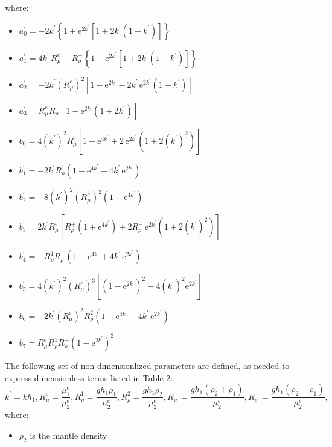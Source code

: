 where:
\begin{itemize}
	\item $a_0^{\prime} = -2k^{\prime} \left\{ 1 + \text{e}^{2k^{\prime}} \left[ 1 + 2k^{\prime} \left( 1 + k^{\prime} \right)  \right] \right\}$
	\item $a_1^{\prime} = 4k^{\prime} \, R_{\mu}^e - R_{\rho}^- \left\{ 1 + \text{e}^{2k^{\prime}} \left[ 1 + 2k^{\prime} \left( 1 + k^{\prime} \right)  \right] \right\}$
	\item $a_2^{\prime} = -2k^{\prime} \left( R_{\mu}^e \right)^2 \left[ 1 - \text{e}^{2k^{\prime}} - 2k^{\prime} \, \text{e}^{2k^{\prime}} \left( 1 + k^{\prime} \right) \right]$
	\item $a_3^{\prime} = R_{\mu}^e R_{\rho}^- \left[ 1 - \text{e}^{2k^{\prime}} \left( 1 + 2k^{\prime} \right) \right]$
	\item $b_0^{\prime} = 4 (k^{\prime})^2 R_{\mu}^e \left[ 1 + \text{e}^{4k^{\prime}} + 2 \, \text{e}^{2k^{\prime}} \left( 1 + 2 (k^{\prime})^2 \right) \right]$
	\item $b_1^{\prime} = - 2k^{\prime} R_{\rho}^1 \left( 1 -  \text{e}^{4k^{\prime}} + 4k^{\prime} \, \text{e}^{2k^{\prime}} \right)$
	\item $b_2^{\prime} = -8 (k^{\prime})^2 \left( R_{\mu}^e \right)^2 \left( 1- \text{e}^{4k^{\prime}}\right)$
	\item $b_3^{\prime} = 2k^{\prime} R_{\mu}^e \left[ R_{\rho}^+ \left( 1 + \text{e}^{4k^{\prime}} \right) + 2 R_{\rho}^- \, \text{e}^{2k^{\prime}} \left( 1 + 2 (k^{\prime})^2 \right) \right]$
	\item $b_4^{\prime} = - R_{\rho}^1 R_{\rho}^- \left( 1 - \text{e}^{4k^{\prime}} + 4k^{\prime} \, \text{e}^{2k^{\prime}} \right)$
	\item $b_5^{\prime} = 4 (k^{\prime})^2 \left( R_{\mu}^e \right)^3 \left[ \left( 1 - \text{e}^{2k^{\prime}} \right)^2 - 4 (k^{\prime})^2 \text{e}^{2k^{\prime}} \right]$
	\item $b_6^{\prime} = -2k^{\prime} \left( R_{\mu}^e \right)^2 R_{\rho}^2 \left( 1 - \text{e}^{4k^{\prime}} - 4k^{\prime} \, \text{e}^{2k^{\prime}} \right)$
	\item $b_7^{\prime} = R_{\mu}^e R_{\rho}^1 R_{\rho}^- \left( 1 - \text{e}^{2k^{\prime}} \right)^2$
\end{itemize}

The following set of non-dimensionlized parameters are defined, as needed to express dimensionless terms listed in Table 2:
\begin{equation}
	k^{\prime} = kh_1, R_{\mu}^{e} = \frac{\mu_1^e}{\mu_2^e}, R_{\rho}^1 = \frac{g h_1 \rho_1}{\mu_2^e}, R_{\rho}^2 = \frac{g h_1 \rho_2}{\mu_2^e}, R_{\rho}^+ = \frac{g h_1 \left( \rho_2 + \rho_1 \right)}{\mu_2^e}, R_{\rho}^- = \frac{g h_1 \left( \rho_2 - \rho_1 \right)}{\mu_2^e},
\end{equation}
where:
\begin{itemize}
	\item $\rho_2$ is the mantle density
\end{itemize}

